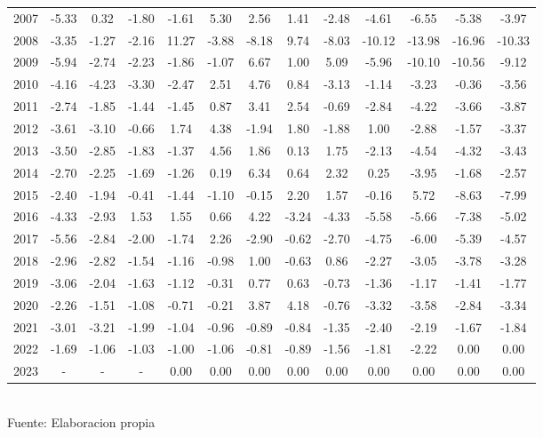 \documentclass{article} %
\begin{document}
\begin{table}[H]
{\begin{tabular}{|c|c|c|c|c|c|c|c|c|c|c|c|c|}
        2007 & -5.33 & 0.32 & -1.80 & -1.61 & 5.30 & 2.56 & 1.41 & -2.48 & -4.61 & -6.55 & -5.38 & -3.97 \\
        2008 & -3.35 & -1.27 & -2.16 & 11.27 & -3.88 & -8.18 & 9.74 & -8.03 & -10.12 & -13.98 & -16.96 & -10.33 \\
        2009 & -5.94 & -2.74 & -2.23 & -1.86 & -1.07 & 6.67 & 1.00 & 5.09 & -5.96 & -10.10 & -10.56 & -9.12 \\
        2010 & -4.16 & -4.23 & -3.30 & -2.47 & 2.51 & 4.76 & 0.84 & -3.13 & -1.14 & -3.23 & -0.36 & -3.56 \\
        2011 & -2.74 & -1.85 & -1.44 & -1.45 & 0.87 & 3.41 & 2.54 & -0.69 & -2.84 & -4.22 & -3.66 & -3.87 \\
        2012 & -3.61 & -3.10 & -0.66 & 1.74 & 4.38 & -1.94 & 1.80 & -1.88 & 1.00 & -2.88 & -1.57 & -3.37 \\
        2013 & -3.50 & -2.85 & -1.83 & -1.37 & 4.56 & 1.86 & 0.13 & 1.75 & -2.13 & -4.54 & -4.32 & -3.43 \\
        2014 & -2.70 & -2.25 & -1.69 & -1.26 & 0.19 & 6.34 & 0.64 & 2.32 & 0.25 & -3.95 & -1.68 & -2.57 \\
        2015 & -2.40 & -1.94 & -0.41 & -1.44 & -1.10 & -0.15 & 2.20 & 1.57 & -0.16 & 5.72 & -8.63 & -7.99 \\
        2016 & -4.33 & -2.93 & 1.53 & 1.55 & 0.66 & 4.22 & -3.24 & -4.33 & -5.58 & -5.66 & -7.38 & -5.02 \\
        2017 & -5.56 & -2.84 & -2.00 & -1.74 & 2.26 & -2.90 & -0.62 & -2.70 & -4.75 & -6.00 & -5.39 & -4.57 \\
        2018 & -2.96 & -2.82 & -1.54 & -1.16 & -0.98 & 1.00 & -0.63 & 0.86 & -2.27 & -3.05 & -3.78 & -3.28 \\
        2019 & -3.06 & -2.04 & -1.63 & -1.12 & -0.31 & 0.77 & 0.63 & -0.73 & -1.36 & -1.17 & -1.41 & -1.77 \\
        2020 & -2.26 & -1.51 & -1.08 & -0.71 & -0.21 & 3.87 & 4.18 & -0.76 & -3.32 & -3.58 & -2.84 & -3.34 \\
        2021 & -3.01 & -3.21 & -1.99 & -1.04 & -0.96 & -0.89 & -0.84 & -1.35 & -2.40 & -2.19 & -1.67 & -1.84 \\
        2022 & -1.69 & -1.06 & -1.03 & -1.00 & -1.06 & -0.81 & -0.89 & -1.56 & -1.81 & -2.22 & 0.00 & 0.00 \\
        2023 & - & - & - & 0.00 & 0.00 & 0.00 & 0.00 & 0.00 & 0.00 & 0.00 & 0.00 & 0.00 \\
    \hline
    \end{tabular}%
    }
    \label{tabprecipitaciones_promedio}
    \vspace{0.2cm}
    \\Fuente: Elaboracion propia
\end{table}
\end{document}
